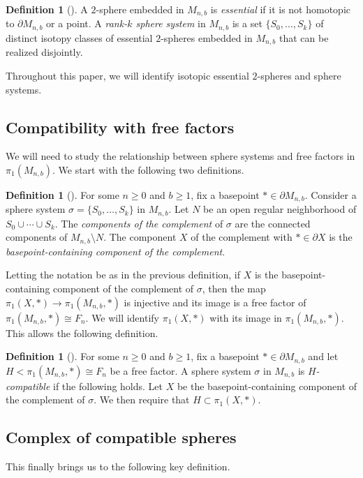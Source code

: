 \documentclass[11pt]{amsart}
\numberwithin{equation}{section}
\theoremstyle{plain}
\theoremstyle{definition}
\newtheorem{defn}[theorem]{Definition}
\newenvironment{definition}[1][]{\begin{defn}[#1]\pushQED{\qed}}{\popQED \end{defn}}
\theoremstyle{remark}
\begin{document}
\begin{definition}
A $2$-sphere embedded in $M_{n,b}$ is {\em essential} if it is not homotopic to $\partial M_{n,b}$ or a point.
A {\em rank-$k$ sphere system} in $M_{n,b}$ is a set $\{S_0,\ldots,S_k\}$ of distinct isotopy classes of
essential $2$-spheres embedded in $M_{n,b}$ that can be realized disjointly.
\end{definition}

Throughout this paper, we will identify isotopic essential $2$-spheres and sphere systems.

\subsection{Compatibility with free factors}
We will need to study the relationship between sphere systems and free factors in $\pi_1(M_{n,b})$.
We start with the following two definitions.

\begin{definition}
For some $n \geq 0$ and $b \geq 1$, fix a basepoint $\ast \in \partial M_{n,b}$.  Consider
a sphere system $\sigma = \{S_0,\ldots,S_k\}$ in $M_{n,b}$.  Let $N$ be an open regular neighborhood
of $S_0 \cup \cdots \cup S_k$.  The {\em components of the complement}
of $\sigma$ are the connected components of $M_{n,b} \setminus N$.  The component $X$ of the complement
with $\ast \in \partial X$ is the {\em basepoint-containing component of the complement}.
\end{definition}

Letting the notation be as in the previous definition, if $X$ is the basepoint-containing
component of the complement of $\sigma$, then the map $\pi_1(X,\ast) \rightarrow \pi_1(M_{n,b},\ast)$
is injective and its image is a free factor of $\pi_1(M_{n,b},\ast) \cong F_n$.
We will identify $\pi_1(X,\ast)$ with its image in $\pi_1(M_{n,b},\ast)$.  This
allows the following definition.

\begin{definition}
For some $n \geq 0$ and $b \geq 1$, fix a basepoint $\ast \in \partial M_{n,b}$ 
and let $H < \pi_1(M_{n,b},\ast) \cong F_n$ be a free factor.
A sphere system $\sigma$ in $M_{n,b}$ is {\em $H$-compatible} if the following holds.  Let $X$ be the
basepoint-containing component of the complement of $\sigma$.  We then require that
$H \subset \pi_1(X,\ast)$.
\end{definition}

\subsection{Complex of compatible spheres}
This finally brings us to the following key definition.
\end{document}
